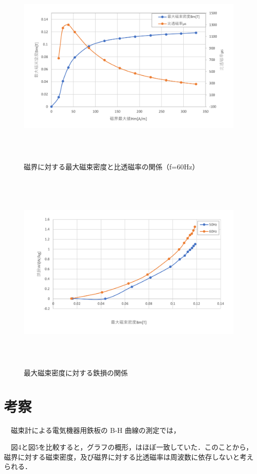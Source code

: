 \begin{figure}[H]
  \centering
  \includegraphics[height=10cm]{./fig/5.png}
  \caption{磁界に対する最大磁束密度と比透磁率の関係（f=60Hz）}
\end{figure}

\begin{figure}[H]
  \centering
  \includegraphics[height=10cm]{./fig/6.png}
  \caption{最大磁束密度に対する鉄損の関係}
\end{figure}

\newpage
\section{考察}
　磁束計による電気機器用鉄板の B-H 曲線の測定では，

　図4と図5を比較すると，グラフの概形，はほぼ一致していた．このことから，磁界に対する磁束密度，及び磁界に対する比透磁率は周波数に依存しないと考えられる．


\newpage
\theendnotes


